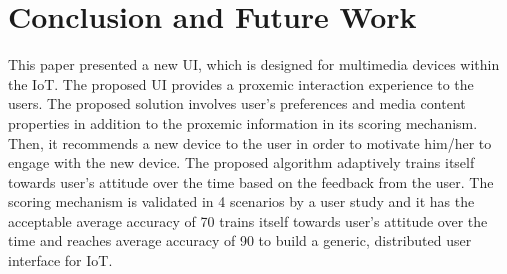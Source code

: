 \documentclass[runningheads,a4paper]{llncs}
\begin{document}
\section{Conclusion and Future Work}\label{references}
This paper presented a new UI, which is designed for multimedia devices within
the IoT. The proposed UI provides a proxemic interaction experience to the
users. The proposed solution involves user’s preferences and media content properties in addition to the proxemic information in its scoring mechanism. Then,
it recommends a new device to the user in order to motivate him/her to engage
with the new device. The proposed algorithm adaptively trains itself towards
user’s attitude over the time based on the feedback from the user. The scoring
mechanism is validated in 4 scenarios by a user study and it has the acceptable
average accuracy of 70%
trains itself towards user’s attitude over the time and reaches average accuracy
of 90%
to build a generic, distributed user interface for IoT.
\end{document}
